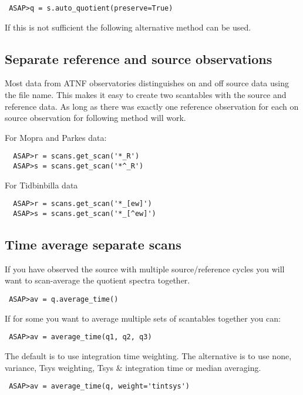 \documentclass[11pt]{article}
\begin{document}
\begin{verbatim}
 ASAP>q = s.auto_quotient(preserve=True)
\end{verbatim}

If this is not sufficient the following alternative method can be used.

\subsection{Separate reference and source observations}

Most data from ATNF observatories
distinguishes on and off source data using the file name. This makes
it easy to create two scantables with the source and reference
data. As long as there was exactly one reference observation for each
on source observation for following method will work.

For Mopra and Parkes data:
\begin{verbatim}
  ASAP>r = scans.get_scan('*_R')
  ASAP>s = scans.get_scan('*^_R')
\end{verbatim}

For Tidbinbilla data
\begin{verbatim}
  ASAP>r = scans.get_scan('*_[ew]')
  ASAP>s = scans.get_scan('*_[^ew]')
\end{verbatim}

\subsection{Time average separate scans}

If you have observed the source with multiple
source/reference cycles you will want to scan-average the quotient
spectra together.

\begin{verbatim}
 ASAP>av = q.average_time()
\end{verbatim}

If for some you want to average multiple sets of scantables together
you can:

\begin{verbatim}
 ASAP>av = average_time(q1, q2, q3)
\end{verbatim}

The default is to use integration time weighting. The alternative is
to use none, variance, Tsys weighting, Tsys \& integration time or
median averaging.

\begin{verbatim}
 ASAP>av = average_time(q, weight='tintsys')
\end{verbatim}
\end{document}
